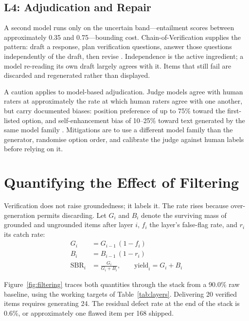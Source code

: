\documentclass[stu,11pt,floatsintext]{apa7}
\begin{document}
\subsection{L4: Adjudication and Repair}

A second model runs only on the uncertain band---entailment scores between
approximately 0.35 and 0.75---bounding cost. Chain-of-Verification supplies the
pattern: draft a response, plan verification questions, answer those questions
independently of the draft, then revise \parencite{dhuliawala2024chain}.
Independence is the active ingredient; a model re-reading its own draft largely
agrees with it. Items that still fail are discarded and regenerated rather than
displayed.

A caution applies to model-based adjudication. Judge models agree with human
raters at approximately the rate at which human raters agree with one another,
but carry documented biases: position preference of up to 75\% toward the
first-listed option, and self-enhancement bias of 10--25\% toward text generated
by the same model family \parencite{gu2024survey}. Mitigations are to use a
different model family than the generator, randomise option order, and calibrate
the judge against human labels before relying on it.

\section{Quantifying the Effect of Filtering}

Verification does not raise groundedness; it labels it. The rate rises because
over-generation permits discarding. Let $G_i$ and $B_i$ denote the surviving
mass of grounded and ungrounded items after layer $i$, $f_i$ the layer's
false-flag rate, and $r_i$ its catch rate:
\begin{align}
G_i &= G_{i-1}\,(1 - f_i) \\
B_i &= B_{i-1}\,(1 - r_i) \\
\mathrm{SBR}_i &= \frac{G_i}{G_i + B_i}, \qquad
\mathrm{yield}_i = G_i + B_i
\end{align}

Figure~\ref{fig:filtering} traces both quantities through the stack from a
90.0\% raw baseline, using the working targets of Table~\ref{tab:layers}.
Delivering 20 verified items requires generating 24. The residual defect rate at
the end of the stack is 0.6\%, or approximately one flawed item per 168 shipped.
\end{document}
